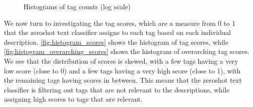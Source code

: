 \begin{figure}[h]
    \centering
    \hfill
    \caption{Histograms of tag counts (log scale)}
    \label{fig:histograms}
\end{figure}

We now turn to investigating the tag scores, which are a measure from 0 to 1 that the zeroshot text classifier assigns to each tag based on each individual description. \cref{fig:histogram_scores} shows the histogram of tag scores, while \cref{fig:histogram_overarching_scores} shows the histogram of overarching tag scores. We see that the distribution of scores is skewed, with a few tags having a very low score (close to 0) and a few tags having a very high score (close to 1), with the remaining tags having scores in between. This means that the zeroshot text classifier is filtering out tags that are not relevant to the descriptions, while assigning high scores to tags that are relevant.


